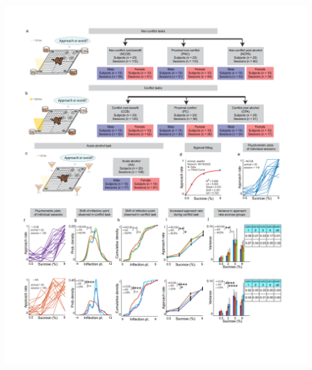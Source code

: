 \documentclass{article}
\begin{document}
\begin{figure} %
  \centering
  \includegraphics[width=\textwidth, trim=50 50 50 50]{Figs/Alcohol_main_1.pdf}
\end{figure}

\clearpage

\captionsetup{type=figure}  %
\caption{\textbf{Overview and general analysis of behavioral tasks}. (a) Non-conflict, (b) conflict, and (c) acute alcohol cost-benefit tasks utilizing the RECORD setup where one of four sucrose concentrations are dispensed into a bowl surrounded by LED lights. (d) Example of psychometric function from a singular non-conflict cost benefit (NCCB) session, fitted with a 4-parameter logistic model $(f(x) = d + (a-d)/ (1 + (x/c)^b))$. Individual (n=20) psychometric functions demonstrating approach rate in non-conflict (e), conflict (f, top), and acute alcohol cost benefit tasks (f, bottom). (g, top) No significant difference in probability density of inflection points between acute alcohol (AA) compared to NCCB (p = 0.08) or NCPA (p = 0.75). (g, bottom) There are significant differences between AA, cost benefit conflict (CCB) tasks (KS test, p $<$ 0.0001), and no significant differences between AA and CPA (p = 0.17). (h) Inflection point distribution represented as a cumulative density function. (i, top) When comparing NCCB to AA (p = 0.001) and NCPA to NCCB (p = 0.05) approach rates are significantly different. (i, bottom) Similarly, comparing CCB to AA (p $<$ 0.0001) and CCB to CPA (p = 0.04) approach rates are also significantly different. (j) Variance in approach rate, with error bars depicting upper and lower confidence intervals with 95\% significance, show significance between NCCB and AA tasks (F-test, p = 0.0096), and CCB and AA tasks (F-test, p $<$ 0.0001).}
\label{fig:alcohol_main_1}
\end{document}
